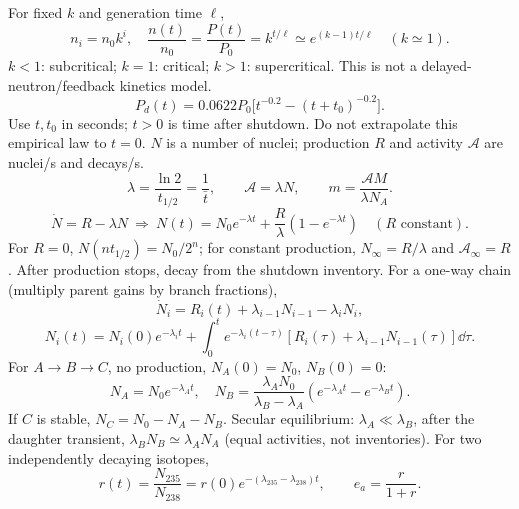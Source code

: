 \begin{handoutcolumns}
 For fixed $k$ and generation time $\ell$,
\[
 n_i=n_0k^i,\quad
 \frac{n(t)}{n_0}=\frac{P(t)}{P_0}=k^{t/\ell}
 \simeq e^{(k-1)t/\ell}\quad(k\simeq1).
\]
$k<1$: subcritical; $k=1$: critical; $k>1$: supercritical.
This is not a delayed-neutron/feedback kinetics model.
\[
 P_d(t)=0.0622P_0\big[t^{-0.2}-(t+t_0)^{-0.2}\big].
\]
Use $t,t_0$ in seconds; $t>0$ is time after shutdown.
Do not extrapolate this empirical law to $t=0$.
 $N$ is a number of nuclei; production
$R$ and activity $\mathcal A$ are nuclei/s and decays/s.
\[
 \lambda=\frac{\ln2}{t_{1/2}}=\frac1{\bar t},\qquad
 \mathcal A=\lambda N,\qquad m=\frac{\mathcal A M}{\lambda N_A}.
\]
\[
 \dot N=R-\lambda N\ \Longrightarrow\
 N(t)=N_0e^{-\lambda t}+\frac{R}{\lambda}(1-e^{-\lambda t})
 \quad(R\text{ constant}).
\]
For $R=0$, $N(nt_{1/2})=N_0/2^n$; for constant production,
$N_\infty=R/\lambda$ and $\mathcal A_\infty=R$. After production
stops, decay from the shutdown inventory.
For a one-way chain (multiply parent gains by branch fractions),
\[
 \dot N_i=R_i(t)+\lambda_{i-1}N_{i-1}-\lambda_iN_i,
\]
\[
 N_i(t)=N_i(0)e^{-\lambda_it}
 +\int_0^t e^{-\lambda_i(t-\tau)}
 [R_i(\tau)+\lambda_{i-1}N_{i-1}(\tau)]\dd\tau.
\]
For $A\to B\to C$, no production, $N_A(0)=N_0$, $N_B(0)=0$:
\[
 N_A=N_0e^{-\lambda_A t},\quad
 N_B=\frac{\lambda_AN_0}{\lambda_B-\lambda_A}
       (e^{-\lambda_A t}-e^{-\lambda_B t}).
\]
If $C$ is stable, $N_C=N_0-N_A-N_B$. Secular equilibrium:
$\lambda_A\ll\lambda_B$, after the daughter transient,
$\lambda_BN_B\simeq\lambda_AN_A$ (equal activities, not inventories).
For two independently decaying isotopes,
\[
 r(t)=\frac{N_{235}}{N_{238}}=r(0)e^{-(\lambda_{235}-\lambda_{238})t},
 \qquad e_a=\frac{r}{1+r}.
\]


\end{handoutcolumns}
